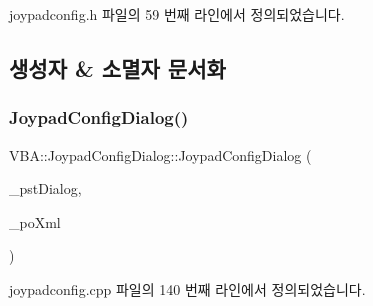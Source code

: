 joypadconfig.\+h 파일의 59 번째 라인에서 정의되었습니다.



\subsection{생성자 \& 소멸자 문서화}
\mbox{\label{class_v_b_a_1_1_joypad_config_dialog_a056ae385dbbaa2eef8e8b8913da72b79}} 
\subsubsection{\texorpdfstring{Joypad\+Config\+Dialog()}{JoypadConfigDialog()}}
{\footnotesize\ttfamily V\+B\+A\+::\+Joypad\+Config\+Dialog\+::\+Joypad\+Config\+Dialog (\begin{DoxyParamCaption}\item[{Gtk\+Dialog $\ast$}]{\+\_\+pst\+Dialog,  }\item[{\mbox{\hyperlink{getopt1_8c_a2c212835823e3c54a8ab6d95c652660e}{const}} Glib\+::\+Ref\+Ptr$<$ Gnome\+::\+Glade\+::\+Xml $>$ \&}]{\+\_\+po\+Xml }\end{DoxyParamCaption})}



joypadconfig.\+cpp 파일의 140 번째 라인에서 정의되었습니다.


